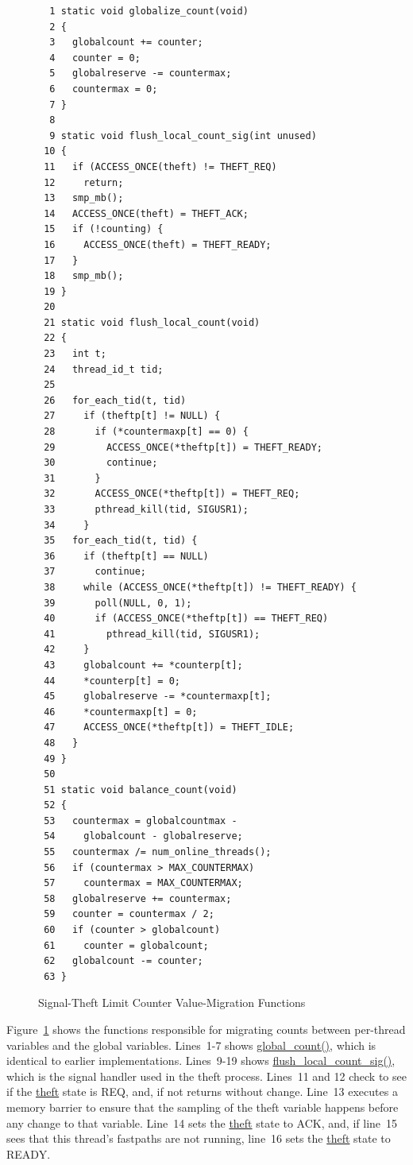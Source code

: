 \begin{figure}[tbp]
{ \scriptsize
\begin{verbatim}
  1 static void globalize_count(void)
  2 {
  3   globalcount += counter;
  4   counter = 0;
  5   globalreserve -= countermax;
  6   countermax = 0;
  7 }
  8 
  9 static void flush_local_count_sig(int unused)
 10 {
 11   if (ACCESS_ONCE(theft) != THEFT_REQ)
 12     return;
 13   smp_mb();
 14   ACCESS_ONCE(theft) = THEFT_ACK;
 15   if (!counting) {
 16     ACCESS_ONCE(theft) = THEFT_READY;
 17   }
 18   smp_mb();
 19 }
 20 
 21 static void flush_local_count(void)
 22 {
 23   int t;
 24   thread_id_t tid;
 25 
 26   for_each_tid(t, tid)
 27     if (theftp[t] != NULL) {
 28       if (*countermaxp[t] == 0) {
 29         ACCESS_ONCE(*theftp[t]) = THEFT_READY;
 30         continue;
 31       }
 32       ACCESS_ONCE(*theftp[t]) = THEFT_REQ;
 33       pthread_kill(tid, SIGUSR1);
 34     }
 35   for_each_tid(t, tid) {
 36     if (theftp[t] == NULL)
 37       continue;
 38     while (ACCESS_ONCE(*theftp[t]) != THEFT_READY) {
 39       poll(NULL, 0, 1);
 40       if (ACCESS_ONCE(*theftp[t]) == THEFT_REQ)
 41         pthread_kill(tid, SIGUSR1);
 42     }
 43     globalcount += *counterp[t];
 44     *counterp[t] = 0;
 45     globalreserve -= *countermaxp[t];
 46     *countermaxp[t] = 0;
 47     ACCESS_ONCE(*theftp[t]) = THEFT_IDLE;
 48   }
 49 }
 50 
 51 static void balance_count(void)
 52 {
 53   countermax = globalcountmax -
 54     globalcount - globalreserve;
 55   countermax /= num_online_threads();
 56   if (countermax > MAX_COUNTERMAX)
 57     countermax = MAX_COUNTERMAX;
 58   globalreserve += countermax;
 59   counter = countermax / 2;
 60   if (counter > globalcount)
 61     counter = globalcount;
 62   globalcount -= counter;
 63 }
\end{verbatim}
}
\caption{Signal-Theft Limit Counter Value-Migration Functions}
\label{fig:count:Signal-Theft Limit Counter Value-Migration Functions}
\end{figure}

Figure~\ref{fig:count:Signal-Theft Limit Counter Value-Migration Functions}
shows the functions responsible for migrating counts between per-thread
variables and the global variables.
Lines~1-7 shows \url{global_count()}, which is identical to earlier
implementations.
Lines~9-19 shows \url{flush_local_count_sig()}, which is the signal
handler used in the theft process.
Lines~11 and 12 check to see if the \url{theft} state is REQ, and, if not
returns without change.
Line~13 executes a memory barrier to ensure that the sampling of the
theft variable happens before any change to that variable.
Line~14 sets the \url{theft} state to ACK, and, if line~15 sees that
this thread's fastpaths are not running, line~16 sets the \url{theft}
state to READY.

